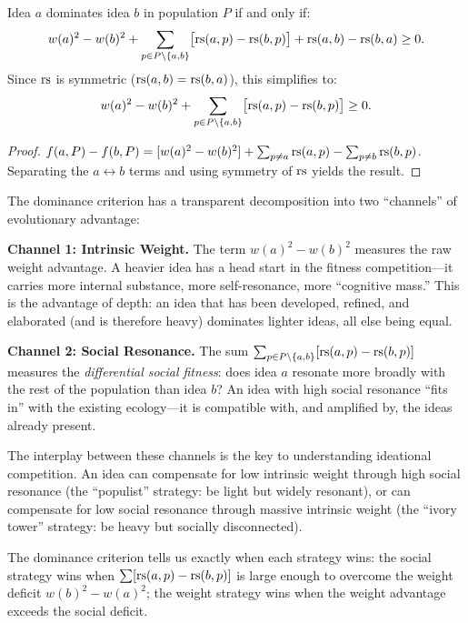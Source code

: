 \begin{theorem}
\label{thm:dominance}
Idea $a$ dominates idea $b$ in population $P$ if and only if:
\[
  w(a)^2 - w(b)^2 + \sum_{p \in P \setminus \{a, b\}}
  \bigl[\mathrm{rs}(a, p) - \mathrm{rs}(b, p)\bigr] + \mathrm{rs}(a, b) - \mathrm{rs}(b, a) \geq 0.
\]
Since $\mathrm{rs}$ is symmetric ($\mathrm{rs}(a,b) = \mathrm{rs}(b,a)$), this simplifies to:
\[
  w(a)^2 - w(b)^2 + \sum_{p \in P \setminus \{a,b\}}
  \bigl[\mathrm{rs}(a,p) - \mathrm{rs}(b,p)\bigr] \geq 0.
\]
\end{theorem}

\begin{proof}
$f(a, P) - f(b, P) = [w(a)^2 - w(b)^2] + \sum_{p \neq a} \mathrm{rs}(a,p) -
\sum_{p \neq b} \mathrm{rs}(b,p)$.  Separating the $a \leftrightarrow b$ terms and
using symmetry of $\mathrm{rs}$ yields the result.
\end{proof}

\begin{remark}
\label{rem:dominance-intuition}
The dominance criterion has a transparent decomposition into two ``channels''
of evolutionary advantage:

\textbf{Channel 1: Intrinsic Weight.}  The term $w(a)^2 - w(b)^2$ measures
the raw weight advantage.  A heavier idea has a head start in the fitness
competition---it carries more internal substance, more self-resonance, more
``cognitive mass.''  This is the advantage of depth: an idea that has been
developed, refined, and elaborated (and is therefore heavy) dominates lighter
ideas, all else being equal.

\textbf{Channel 2: Social Resonance.}  The sum
$\sum_{p \in P \setminus \{a,b\}} [\mathrm{rs}(a,p) - \mathrm{rs}(b,p)]$ measures the
\emph{differential social fitness}: does idea $a$ resonate more broadly with
the rest of the population than idea $b$?  An idea with high social resonance
``fits in'' with the existing ecology---it is compatible with, and amplified
by, the ideas already present.

The interplay between these channels is the key to understanding ideational
competition.  An idea can compensate for low intrinsic weight through high
social resonance (the ``populist'' strategy: be light but widely resonant),
or can compensate for low social resonance through massive intrinsic weight
(the ``ivory tower'' strategy: be heavy but socially disconnected).

The dominance criterion tells us exactly when each strategy wins: the social
strategy wins when $\sum [\mathrm{rs}(a,p) - \mathrm{rs}(b,p)]$ is large enough to overcome
the weight deficit $w(b)^2 - w(a)^2$; the weight strategy wins when the
weight advantage exceeds the social deficit.
\end{remark}

